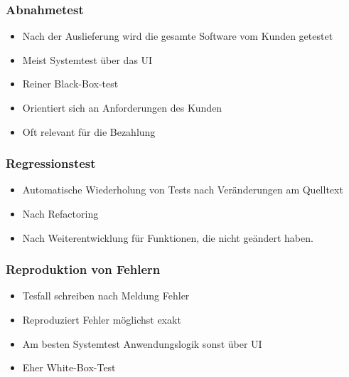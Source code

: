 \documentclass[../ZF_SWEN1.tex]{subfiles}
\begin{document}
\subsubsection{Abnahmetest}
\begin{itemize}
	\item Nach der Auslieferung wird die gesamte Software vom Kunden getestet
	\item Meist Systemtest über das UI
	\item Reiner Black-Box-test
	\item Orientiert sich an Anforderungen des Kunden
	\item Oft relevant für die Bezahlung
\end{itemize}


\subsubsection{Regressionstest}
\begin{itemize}
	\item Automatische Wiederholung von Tests nach Veränderungen am Quelltext
	\item Nach Refactoring
	\item Nach Weiterentwicklung für Funktionen, die nicht geändert haben.
\end{itemize}

\subsubsection{Reproduktion von Fehlern}
\begin{itemize}
	\item Tesfall schreiben nach Meldung Fehler
	\item Reproduziert Fehler möglichst exakt
	\item Am besten Systemtest Anwendungslogik sonst über UI
	\item Eher White-Box-Test
\end{itemize}
\end{document}
